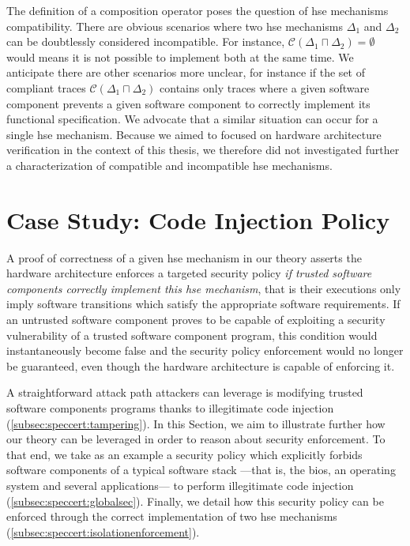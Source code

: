 The definition of a composition operator poses the question of \ac{hse}
mechanisms compatibility.
%
There are obvious scenarios where two \ac{hse} mechanisms \( \Delta_1 \) and
\( \Delta_2 \) can be doubtlessly considered incompatible.
%
For instance, \( \mathcal{C}(\Delta_1 \sqcap \Delta_2) = \emptyset \) would
means it is not possible to implement both at the same time.
%
We anticipate there are other scenarios more unclear, for instance if the set of
compliant traces \( \mathcal{C}(\Delta_1 \sqcap \Delta_2) \) contains only
traces where a given software component prevents a given software component to
correctly implement its functional specification.
%
We advocate that a similar situation can occur for a single \ac{hse} mechanism.
%
Because we aimed to focused on hardware architecture verification in the context
of this thesis, we therefore did not investigated further a characterization of
compatible and incompatible \ac{hse} mechanisms.

%

\section{Case Study: Code Injection Policy}
\label{sec:speccert:casestudy}

A proof of correctness of a given \ac{hse} mechanism in our theory asserts the
hardware architecture enforces a targeted security policy \emph{if trusted
  software components correctly implement this \ac{hse} mechanism}, that is
their executions only imply software transitions which satisfy the appropriate
software requirements.
%
If an untrusted software component proves to be capable of exploiting a security
vulnerability of a trusted software component program, this condition would
instantaneously become false and the security policy enforcement would no longer
be guaranteed, even though the hardware architecture is capable of enforcing it.

A straightforward attack path attackers can leverage is modifying trusted
software components programs thanks to illegitimate code injection
(\ref{subsec:speccert:tampering}).
%
In this Section, we aim to illustrate further how our theory can be leveraged in
order to reason about security enforcement.
%
To that end, we take as an example a security policy which explicitly forbids
software components of a typical software stack ---that is, the \ac{bios}, an
operating system and several applications--- to perform illegitimate code
injection (\ref{subsec:speccert:globalsec}).
%
Finally, we detail how this security policy can be enforced through the correct
implementation of two \ac{hse} mechanisms
(\ref{subsec:speccert:isolationenforcement}).

